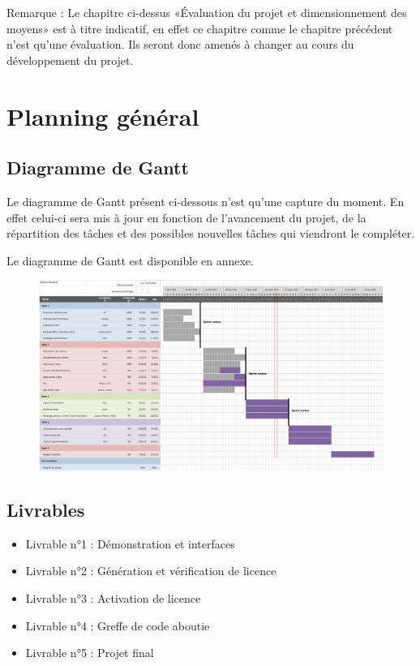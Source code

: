 Remarque : Le chapitre ci-dessus «Évaluation du projet et dimensionnement des moyens» est à titre
indicatif, en effet ce chapitre comme le chapitre précédent n'est qu'une évaluation. Ils seront
donc amenés à changer au cours du développement du projet.

\chapter{Planning général}

\section{Diagramme de Gantt}

Le diagramme de Gantt présent ci-dessous n'est qu'une capture du moment. En effet celui-ci sera
mis à jour en fonction de l'avancement du projet, de la répartition des tâches et des possibles
nouvelles tâches qui viendront le compléter.\newline

Le diagramme de Gantt est disponible en annexe.

\begin{figure}[!h]
    \centering
    \includegraphics[width=17cm]{Gantt.png}
\end{figure}

\section{Livrables}
\begin{itemize}
	\item Livrable n°1 : Démonstration et interfaces
	\item Livrable n°2 : Génération et vérification de licence
	\item Livrable n°3 : Activation de licence
	\item Livrable n°4 : Greffe de code aboutie
	\item Livrable n°5 : Projet final
\end{itemize}

